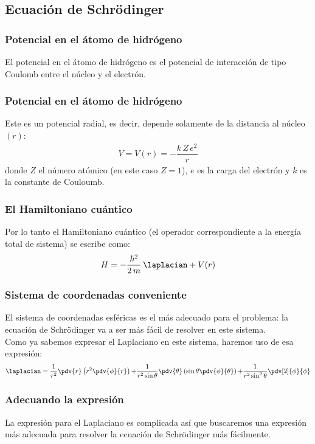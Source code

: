 \subsection{Ecuación de Schrödinger }
\begin{frame}
\frametitle{Potencial en el átomo de hidrógeno}
El potencial en el átomo de hidrógeno es el potencial de interacción de tipo Coulomb entre el núcleo y el electrón.
\end{frame}
\begin{frame}
\frametitle{Potencial en el átomo de hidrógeno}
Este es un potencial radial, es decir, depende solamente de la distancia al núcleo $(r)$:
\begin{align}
V = V(r) = - \dfrac{k \, Z \, e^{2}}{r}
\label{eq:ecuacion_01}
\end{align}
donde $Z$ el número atómico (en este caso $Z=1$), $e$ es la carga del electrón y $k$ es la constante de Couloumb.
\end{frame} 
\begin{frame}
\frametitle{El Hamiltoniano cuántico}
Por lo tanto el Hamiltoniano cuántico (el operador correspondiente a la energía total de sistema) se escribe como:
\begin{align}
H = - \dfrac{\hbar^{2}}{2 \, m} \, \laplacian + V(r)
\label{eq:ecuacion_02} 
\end{align}
\end{frame}
\begin{frame}
\frametitle{Sistema de coordenadas conveniente}
El sistema de coordenadas esféricas es el más adecuado para el problema: la ecuación de Schrödinger va a ser más fácil de resolver en este sistema.
\\
\bigskip
\pause
Como ya sabemos expresar el Laplaciano en este sistema, haremos uso de esa expresión:
\fontsize{12}{12}\selectfont
\begin{align*}
\laplacian = \dfrac{1}{r^{2}} \pdv{r} \left( r^{2} \pdv{\phi}{r} \right) {+} \dfrac{1}{r^{2} \sin \theta} \pdv{\theta} \left( \sin \theta \pdv{\phi}{\theta} \right) {+} \dfrac{1}{r^{2} \sin^{2} \theta} \pdv[2]{\phi}{\phi} 
\end{align*}
\end{frame}
\begin{frame}
\frametitle{Adecuando la expresión}
La expresión para el Laplaciano es complicada así que buscaremos una expresión más adecuada para resolver la ecuación de Schrödinger más fácilmente.
\end{frame}
